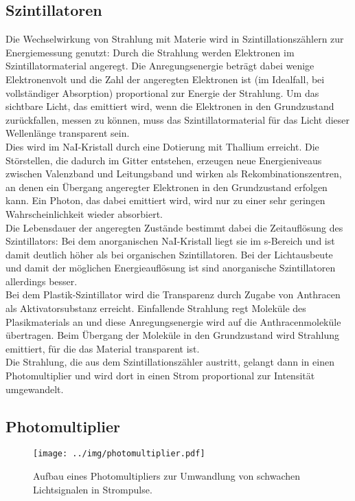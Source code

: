 \subsection{Szintillatoren}
Die Wechselwirkung von Strahlung mit Materie wird in Szintillationszählern zur Energiemessung genutzt:
Durch die Strahlung werden Elektronen im Szintillatormaterial angeregt.
Die Anregungsenergie beträgt dabei wenige Elektronenvolt und die Zahl der angeregten Elektronen
ist (im Idealfall, bei vollständiger Absorption) proportional zur Energie der Strahlung.
Um das sichtbare Licht, das emittiert wird, wenn die Elektronen in den Grundzustand zurückfallen,
messen zu können, muss das Szintillatormaterial für das Licht dieser Wellenlänge transparent sein.\\
Dies wird im NaI-Kristall durch eine Dotierung mit Thallium erreicht.
Die Störstellen, die dadurch im Gitter entstehen,
erzeugen neue Energieniveaus zwischen Valenzband und Leitungsband und wirken als
Rekombinationszentren, an denen ein Übergang angeregter Elektronen in den Grundzustand erfolgen kann.
Ein Photon, das dabei emittiert wird, wird nur zu einer sehr geringen Wahrscheinlichkeit
wieder absorbiert.\\
Die Lebensdauer der angeregten Zustände bestimmt dabei die Zeitauflösung des Szintillators:
Bei dem anorganischen NaI-Kristall liegt sie im \textmu s-Bereich und ist damit deutlich
höher als bei organischen Szintillatoren.
Bei der Lichtausbeute und damit der möglichen Energieauflösung ist sind anorganische
Szintillatoren allerdings besser.\\
Bei dem Plastik-Szintillator wird die Transparenz durch Zugabe von Anthracen als Aktivatorsubstanz erreicht.
Einfallende Strahlung regt Moleküle des Plasikmaterials an und diese Anregungsenergie wird auf die Anthracenmoleküle
übertragen. Beim Übergang der Moleküle in den Grundzustand wird Strahlung emittiert,
für die das Material transparent ist.\\
Die Strahlung, die aus dem Szintillationszähler austritt,
gelangt dann in einen Photomultiplier und wird dort in einen Strom proportional zur Intensität umgewandelt.

\subsection{Photomultiplier}

\begin{figure}[H]
\begin{center}
  \texttt{[image: ../img/photomultiplier.pdf]}
  \caption[---]{Aufbau eines Photomultipliers zur Umwandlung von schwachen Lichtsignalen in Strompulse.}
  \label{img:aufbau}
\end{center}
\end{figure}